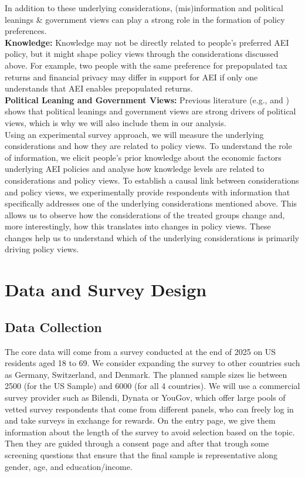 \documentclass[11pt]{article}
\begin{document}
In addition to these underlying considerations, (mis)information and political leanings \& government views can play a strong role in the formation of policy preferences.
\\[0.5em]
\textbf{Knowledge:} Knowledge may not be directly related to people's preferred AEI policy, but it might shape policy views through the considerations discussed above. For example, two people with the same preference for prepopulated tax returns and financial privacy may differ in support for AEI if only one understands that AEI enables prepopulated returns. \\[0.5em]
\textbf{Political Leaning and Government Views:} Previous literature (e.g., \textcite{kuziemko2015elastic} and \textcite{stantcheva2021understanding}) shows that political leanings and government views are strong drivers of political views, which is why we will also include them in our analysis.   \\[1em]
Using an experimental survey approach, we will measure the underlying considerations and how they are related to policy views. To understand the role of information, we elicit people's prior knowledge about the economic factors underlying AEI policies and analyse how knowledge levels are related to considerations and policy views. To establish a causal link between considerations and policy views, we experimentally provide respondents with information that specifically addresses one of the underlying considerations mentioned above.  This allows us to observe how the considerations of the treated groups change and, more interestingly, how this translates into changes in policy views. These changes help us to understand which of the underlying considerations is primarily driving policy views. 
\section{Data and Survey Design}
\subsection{Data Collection}
The core data will come from a survey conducted at the end of 2025 on US residents aged 18 to 69. We consider expanding the survey to other countries such as Germany, Switzerland, and Denmark. The planned sample sizes lie between 2500 (for the US Sample) and 6000 (for all 4 countries). We will use a commercial survey provider such as Bilendi, Dynata or YouGov, which offer large pools of vetted survey respondents that come from different panels, who can freely log in and take surveys in exchange for rewards. On the entry page, we give them information about the length of the survey to avoid selection based on the topic. Then they are guided through a consent page and after that trough some screening questions that ensure that the final sample is representative along gender, age, and education/income. 
\end{document}
